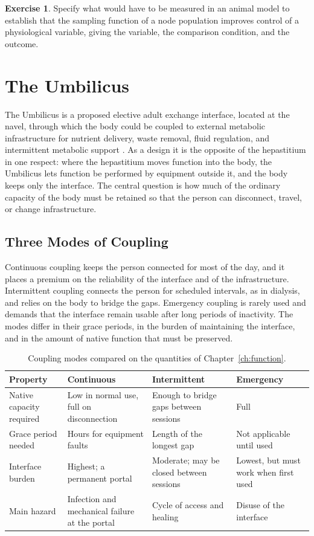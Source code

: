 \documentclass[11pt,openany]{book}
\theoremstyle{definition}
\newtheorem{exercise}{Exercise}[chapter]
\theoremstyle{remark}
\begin{document}
\begin{exercise}
Specify what would have to be measured in an animal model to establish that the sampling function of a node population improves control of a physiological variable, giving the variable, the comparison condition, and the outcome.
\end{exercise}

\chapter{The Umbilicus}
\label{ch:umbilicus}

The Umbilicus is a proposed elective adult exchange interface, located at the navel, through which the body could be coupled to external metabolic infrastructure for nutrient delivery, waste removal, fluid regulation, and intermittent metabolic support \cite{flyxion2026cm}. As a design it is the opposite of the hepastitium in one respect: where the hepastitium moves function into the body, the Umbilicus lets function be performed by equipment outside it, and the body keeps only the interface. The central question is how much of the ordinary capacity of the body must be retained so that the person can disconnect, travel, or change infrastructure.

\section{Three Modes of Coupling}

Continuous coupling keeps the person connected for most of the day, and it places a premium on the reliability of the interface and of the infrastructure. Intermittent coupling connects the person for scheduled intervals, as in dialysis, and relies on the body to bridge the gaps. Emergency coupling is rarely used and demands that the interface remain usable after long periods of inactivity. The modes differ in their grace periods, in the burden of maintaining the interface, and in the amount of native function that must be preserved.

\begin{table}[ht]
\centering
\caption{Coupling modes compared on the quantities of Chapter~\ref{ch:function}.}
\label{tab:modes}
\small
\begin{tabular}{@{}p{2.6cm}p{3.5cm}p{3.5cm}p{3.5cm}@{}}
\toprule
Property & Continuous & Intermittent & Emergency \\
\midrule
Native capacity required & Low in normal use, full on disconnection & Enough to bridge gaps between sessions & Full \\
Grace period needed & Hours for equipment faults & Length of the longest gap & Not applicable until used \\
Interface burden & Highest; a permanent portal & Moderate; may be closed between sessions & Lowest, but must work when first used \\
Main hazard & Infection and mechanical failure at the portal & Cycle of access and healing & Disuse of the interface \\
\bottomrule
\end{tabular}
\end{table}
\end{document}
